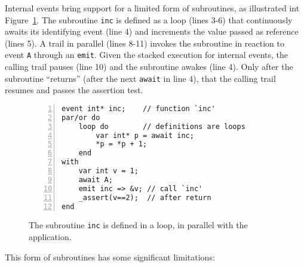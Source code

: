 \documentclass{acm_proc_article-sp}
\newcommand{\CEU}{\textsc{C\'{e}u}\xspace}
\newcommand{\code}[1] {{\small{\texttt{#1}}}}
\newcommand{\1}{\;}
\newcommand{\2}{\;\;}
\newcommand{\3}{\;\;\;}
\newcommand{\5}{\;\;\;\;\;}
\begin{document}
\begin{comment}
{\small
The order of execution for the \code{printf} calls in Esterel is unspecified.
For \CEU, they always print $1$, $2$, and $3$, in this exact order.
}
Signals in Esterel have immediate feedback, i.e., an \code{await} statement can 
react to an \code{emit} in the same time it is reached.
In \CEU, only previously awaiting trails can react to an event.

immediate feedback
    flip-flops
- synthesis of digital circuits
immediate feedback (digital components as simple as flip-flops

causality complications
Note that both internal and external events are unbuffered, i.e., at the moment 
an event occurs, only previously awaiting trails can react to that instance.
\end{comment}

Internal events bring support for a limited form of subroutines, as illustrated 
int Figure~\ref{lst.sub}.
The subroutine \code{inc} is defined as a loop (lines 3-6) that continuously 
awaits its identifying event (line 4) and increments the value passed as 
reference (lines 5).
A trail in parallel (lines 8-11) invokes the subroutine in reaction to event 
\code{A} through an \code{emit}.
Given the stacked execution for internal events, the calling trail pauses (line 
10) and the subroutine awakes (line 4).
Only after the subroutine ``returns'' (after the next \code{await} in line 4), 
that the calling trail resumes and passes the assertion test.
 
\begin{figure}
\begin{lstlisting}[numbers=left,xleftmargin=2em]
event int* inc;    // function `inc'
par/or do
    loop do        // definitions are loops
        var int* p = await inc;
        *p = *p + 1;
    end
with
    var int v = 1;
    await A;
    emit inc => &v; // call `inc'
    _assert(v==2);  // after return
end
\end{lstlisting}
\caption{ The subroutine \code{inc} is defined in a loop, in parallel with the 
application.
\label{lst.sub}
}
\end{figure}

This form of subroutines has some significant limitations:
\end{document}
